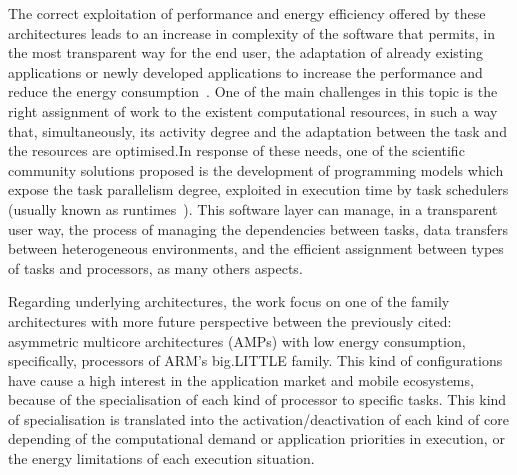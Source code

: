 The correct exploitation of performance and energy efficiency offered by
these architectures leads to an increase in complexity of the software that
permits, in the most transparent way for the end user, the adaptation of
already existing applications or newly developed applications to increase
the performance and reduce the energy consumption~\cite{OsTo10,
  SKC+15}. One of the main challenges in this topic is the right assignment
of work to the existent computational resources, in such a way that,
simultaneously, its activity degree and the adaptation between the task and
the resources are optimised.In response of these needs, one of the
scientific community solutions proposed is the development of programming
models which expose the task parallelism degree, exploited in execution
time by task schedulers (usually known as runtimes~\cite{VMC+14}).
This software layer can manage, in a transparent user way, the process of
managing the dependencies between tasks, data transfers between
heterogeneous environments, and the efficient assignment between types of
tasks and processors, as many others aspects.


Regarding underlying architectures, the work focus on one of the family
architectures with more future perspective between the previously cited:
asymmetric multicore architectures (AMPs) with low energy consumption,
specifically, processors of ARM's big.LITTLE family. This kind of
configurations have cause a high interest in the application market and
mobile ecosystems, because of the specialisation of each kind of processor
to specific tasks. This kind of specialisation is translated into the
activation/deactivation of each kind of core depending of the computational
demand or application priorities in execution, or the energy limitations of
each execution situation. 

